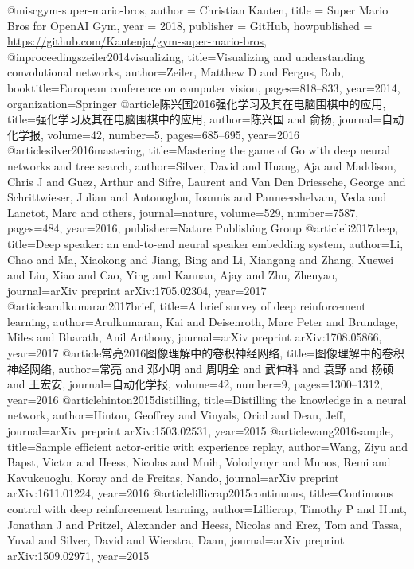 @misc{gym-super-mario-bros,
  author = {Christian Kauten},
  title = {{S}uper {M}ario {B}ros for {O}pen{AI} {G}ym},
  year = {2018},
  publisher = {GitHub},
  howpublished = {\url{https://github.com/Kautenja/gym-super-mario-bros}},
}
@inproceedings{zeiler2014visualizing,
  title={Visualizing and understanding convolutional networks},
  author={Zeiler, Matthew D and Fergus, Rob},
  booktitle={European conference on computer vision},
  pages={818--833},
  year={2014},
  organization={Springer}
}
@article{陈兴国2016强化学习及其在电脑围棋中的应用,
  title={强化学习及其在电脑围棋中的应用},
  author={陈兴国 and 俞扬},
  journal={自动化学报},
  volume={42},
  number={5},
  pages={685--695},
  year={2016}
}
@article{silver2016mastering,
  title={Mastering the game of Go with deep neural networks and tree search},
  author={Silver, David and Huang, Aja and Maddison, Chris J and Guez, Arthur and Sifre, Laurent and Van Den Driessche, George and Schrittwieser, Julian and Antonoglou, Ioannis and Panneershelvam, Veda and Lanctot, Marc and others},
  journal={nature},
  volume={529},
  number={7587},
  pages={484},
  year={2016},
  publisher={Nature Publishing Group}
}
@article{li2017deep,
  title={Deep speaker: an end-to-end neural speaker embedding system},
  author={Li, Chao and Ma, Xiaokong and Jiang, Bing and Li, Xiangang and Zhang, Xuewei and Liu, Xiao and Cao, Ying and Kannan, Ajay and Zhu, Zhenyao},
  journal={arXiv preprint arXiv:1705.02304},
  year={2017}
}
@article{arulkumaran2017brief,
  title={A brief survey of deep reinforcement learning},
  author={Arulkumaran, Kai and Deisenroth, Marc Peter and Brundage, Miles and Bharath, Anil Anthony},
  journal={arXiv preprint arXiv:1708.05866},
  year={2017}
}
@article{常亮2016图像理解中的卷积神经网络,
  title={图像理解中的卷积神经网络},
  author={常亮 and 邓小明 and 周明全 and 武仲科 and 袁野 and 杨硕 and 王宏安},
  journal={自动化学报},
  volume={42},
  number={9},
  pages={1300--1312},
  year={2016}
}
@article{hinton2015distilling,
  title={Distilling the knowledge in a neural network},
  author={Hinton, Geoffrey and Vinyals, Oriol and Dean, Jeff},
  journal={arXiv preprint arXiv:1503.02531},
  year={2015}
}
@article{wang2016sample,
  title={Sample efficient actor-critic with experience replay},
  author={Wang, Ziyu and Bapst, Victor and Heess, Nicolas and Mnih, Volodymyr and Munos, Remi and Kavukcuoglu, Koray and de Freitas, Nando},
  journal={arXiv preprint arXiv:1611.01224},
  year={2016}
}
@article{lillicrap2015continuous,
  title={Continuous control with deep reinforcement learning},
  author={Lillicrap, Timothy P and Hunt, Jonathan J and Pritzel, Alexander and Heess, Nicolas and Erez, Tom and Tassa, Yuval and Silver, David and Wierstra, Daan},
  journal={arXiv preprint arXiv:1509.02971},
  year={2015}
}
